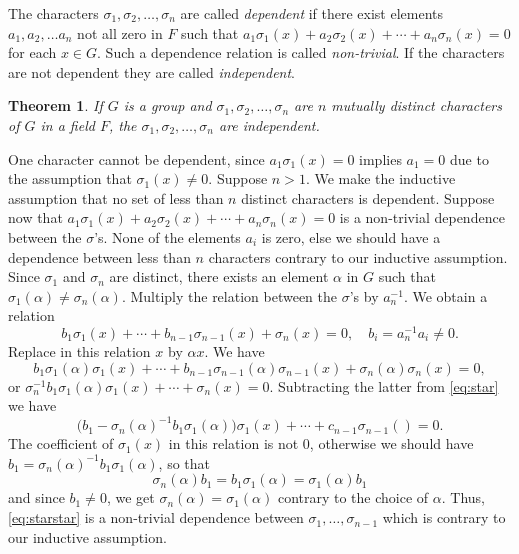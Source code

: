 \documentclass[10pt,leqno,a5paper]{book}
\newtheorem{theo}{Theorem}
\theoremstyle{definition}
\begin{document}
The characters $\sigma_1, \sigma_2, \ldots, \sigma_n$ are called \emph{dependent} if there exist elements $a_1, a_2, \ldots a_n$ not all zero in $F$ such that $a_1 \sigma_1(x) + a_2 \sigma_2(x) + \cdots + a_n \sigma_n(x) = 0$ for each $x \in G$.
Such a dependence relation is called \emph{non-trivial}.
If the characters are not dependent they are called \emph{independent}.


\begin{theo}
\label{theo:ontw}
If $G$ is a group and $\sigma_1, \sigma_2, \ldots, \sigma_n$ are $n$ mutually distinct characters of $G$ in a field $F$, the $\sigma_1, \sigma_2, \ldots, \sigma_n$ are independent.
\end{theo}


One character cannot be dependent, since $a_1 \sigma_1(x) = 0$ implies $a_1 = 0$ due to the assumption that $\sigma_1(x) \not= 0$.
Suppose $n > 1$.
We make the inductive assumption that no set of less than $n$ distinct characters is dependent.
Suppose now that $a_1 \sigma_1(x) + a_2 \sigma_2(x) + \cdots + a_n \sigma_n(x) = 0$ is a non-trivial dependence between the $\sigma$'s.
None of the elements $a_i$ is zero, else we should have a dependence between less than $n$ characters contrary to our inductive assumption.
Since $\sigma_1$ and $\sigma_n$ are distinct, there exists an element $\alpha$ in $G$ such that $\sigma_1(\alpha) \not= \sigma_n(\alpha)$.
Multiply the relation between the $\sigma$'s by $a_n^{-1}$.
We obtain a relation
\begin{equation}
\label{eq:star}
b_1 \sigma_1(x) + \cdots + b_{n-1} \sigma_{n-1}(x) + \sigma_n(x) = 0,
\quad
b_i = a_n^{-1} a_i \not= 0.
\tag{$*$}
\end{equation}
Replace in this relation $x$ by $\alpha x$. We have
\[
b_1 \sigma_1(\alpha) \sigma_1(x)
+ \cdots
+ b_{n-1} \sigma_{n-1} (\alpha) \sigma_{n-1}(x)
+ \sigma_n(\alpha) \sigma_n(x) = 0,
\]
or $\sigma_n^{-1} b_1 \sigma_1(\alpha) \sigma_1(x) + \cdots + \sigma_n(x) = 0$.
Subtracting the latter from \eqref{eq:star} we have
\begin{equation}
\label{eq:starstar}
\bigl(b_1 - \sigma_n(\alpha)^{-1}b_1 \sigma_1(\alpha)\bigr) \sigma_1(x)
+ \cdots
+ c_{n-1} \sigma_{n-1}() = 0.
\tag{$**$}
\end{equation}
The coefficient of $\sigma_1(x)$ in this relation is not 0, otherwise we should have $b_1 = \sigma_n(\alpha)^{-1}b_1\sigma_1(\alpha)$, so that
\[
\sigma_n(\alpha) b_1 = b_1 \sigma_1(\alpha) = \sigma_1(\alpha)b_1
\]
and since $b_1 \not= 0$, we get $\sigma_n(\alpha) = \sigma_1(\alpha)$ contrary to the choice of $\alpha$.
Thus, \eqref{eq:starstar} is a non-trivial dependence between $\sigma_1, \ldots, \sigma_{n-1}$ which is contrary to our inductive assumption.
\end{document}
